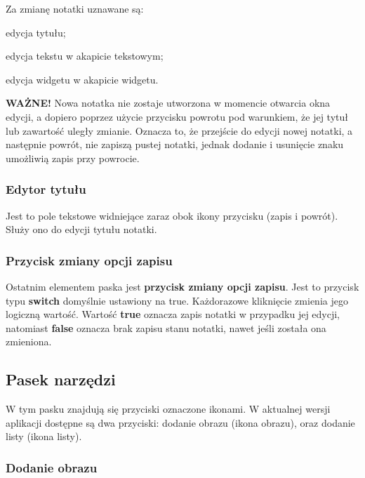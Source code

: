 Za zmianę notatki uznawane są:

\begin{compactitem}
    \item edycja tytułu;
    \item edycja tekstu w akapicie tekstowym;
    \item edycja widgetu w akapicie widgetu.
\end{compactitem}
\vspace{5mm}

\textbf{WAŻNE!} Nowa notatka nie zostaje utworzona w momencie otwarcia okna edycji, a dopiero poprzez użycie przycisku powrotu pod warunkiem, że jej tytuł lub zawartość uległy zmianie. Oznacza to, że przejście do edycji nowej notatki, a następnie powrót, nie zapiszą pustej notatki, jednak dodanie i usunięcie znaku umożliwią zapis przy powrocie.

\subsubsection{Edytor tytułu}

Jest to pole tekstowe widniejące zaraz obok ikony przycisku (zapis i powrót). Służy ono do edycji tytułu notatki.

\subsubsection{Przycisk zmiany opcji zapisu}

Ostatnim elementem paska jest \textbf{przycisk zmiany opcji zapisu}. Jest to przycisk typu \textbf{switch} domyślnie ustawiony na true. Każdorazowe kliknięcie zmienia jego logiczną wartość.
Wartość \textbf{true} oznacza zapis notatki w przypadku jej edycji, natomiast \textbf{false} oznacza brak zapisu stanu notatki, nawet jeśli została ona zmieniona.

\subsection{Pasek narzędzi}

W tym pasku znajdują się przyciski oznaczone ikonami.
W aktualnej wersji aplikacji dostępne są dwa przyciski: dodanie obrazu (ikona obrazu), oraz dodanie listy (ikona listy).

\subsubsection{Dodanie obrazu}

